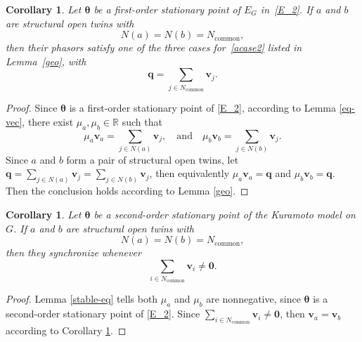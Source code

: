 \documentclass[11pt,reqno]{amsart}
\newtheorem{corollary}[theorem]{Corollary}
\theoremstyle{definition}
\begin{document}
\begin{corollary}\label{coro:structural-open-twins}
Let $\boldsymbol{\theta}$ be a first-order stationary point of $E_G$ in~\eqref{E_2}.
If $a$ and $b$ are structural open twins with
\[
N(a)=N(b)=N_{\mathrm{common}},
\]
then their phasors satisfy one of the three cases for~\eqref{acase2} listed in Lemma~\ref{geo}, with
\[
\boldsymbol q=\sum_{j\in N_{\mathrm{common}}}\boldsymbol v_j.
\]
\end{corollary}

\begin{proof}
Since $\boldsymbol{\theta}$ is a first-order stationary point of \eqref{E_2}, according to Lemma \ref{eq-vec}, there exist $\mu_a,\mu_b \in \mathbb R$ such that
\begin{equation}
    \mu_a\mathbf{v}_a = \sum_{j\in N(a)} \mathbf{v}_j, \quad \mathrm{and} \quad \mu_b\mathbf{v}_b=\sum_{j\in N(b)} \mathbf{v}_j.
\end{equation}
Since $a$ and $b$ form a pair of structural open twins, let $\boldsymbol q=\sum_{j \in N(a)} \mathbf{v}_j=\sum_{j \in N(b)} \mathbf{v}_j$, then equivalently $\mu_a\mathbf{v}_a = \boldsymbol q$ and $\mu_b\mathbf{v}_b = \boldsymbol q$.
Then the conclusion holds according to Lemma \ref{geo}.
\end{proof}

\begin{corollary}\label{stable-open-twins}
Let $\boldsymbol{\theta}$ be a second-order stationary point of the Kuramoto model on $G$.
If $a$ and $b$ are structural open twins with
\[
N(a)=N(b)=N_{\mathrm{common}},
\]
then they synchronize whenever
\[
\sum_{i\in N_{\mathrm{common}}}\boldsymbol v_i\neq \boldsymbol 0.
\]
\end{corollary}

\begin{proof}
   Lemma \ref{stable-eq} tells both $\mu_a$ and $\mu_b$ are nonnegative, since $\boldsymbol{\theta}$ is a second-order stationary point of \eqref{E_2}. Since $\sum_{i \in N_{\mathrm{common}}} \mathbf{v}_i \neq \mathbf{0}$, then $\mathbf{v}_a=\mathbf{v}_b$ according to Corollary \ref{coro:structural-open-twins}.
\end{proof}
\end{document}

